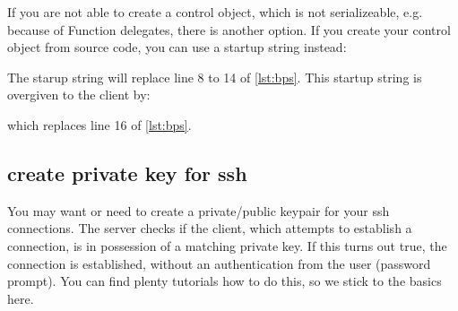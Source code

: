 \documentclass[11pt,twoside,a4paper]{fdyartcl}
\begin{document}
%
%

If you are not able to create a control object, which is not serializeable, e.g. because of Function delegates, there is another option.
If you create your control object from source code, you can use a startup string instead:



The starup string will replace line 8 to 14 of \ref{lst:bps}. This startup string is overgiven to the client by:



which replaces line 16 of \ref{lst:bps}.

\subsection{create private key for ssh}
\label{sec:sshkey}

You may want or need to create a private/public keypair for your ssh connections. The server checks if the client, which attempts to establish a connection, is in possession of a matching private key. If this turns out true, the connection is established, without an authentication from the user (password prompt). You can find plenty tutorials how to do this, so we stick to the basics here.
\end{document}
